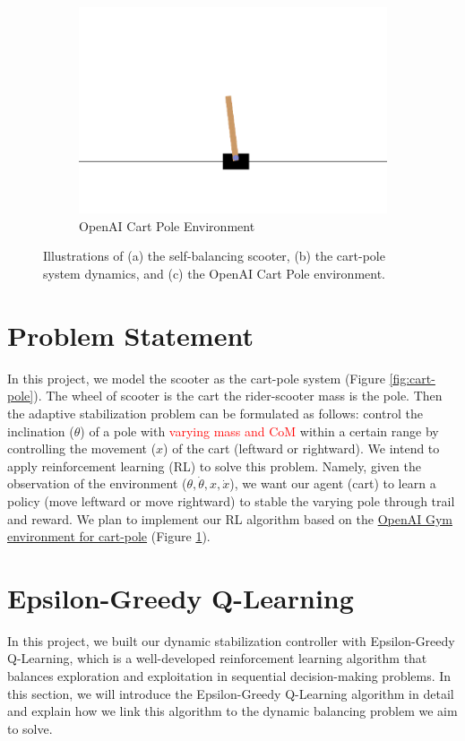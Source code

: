 \documentclass[10pt,a4paper]{article}
\begin{document}
\begin{figure}[H]
\begin{subfigure}[b]{0.3\textwidth}
		\includegraphics[width=\textwidth]{figure/open-ai}
		\caption{OpenAI Cart Pole Environment}
		\label{fig:openai}
	\end{subfigure}
	\caption{Illustrations of (a) the self-balancing scooter, (b) the cart-pole system dynamics, and (c) the OpenAI Cart Pole environment.}
	\label{fig:three graphs}
\end{figure}

\section{Problem Statement}
In this project, we model the scooter as the cart-pole system (Figure \ref{fig:cart-pole}). The wheel of scooter is the cart the rider-scooter mass is the pole. Then the adaptive stabilization problem can be formulated as follows: control the inclination ($\theta$) of a pole with \textcolor{red}{varying mass and CoM} within a certain range by controlling the movement ($x$) of the cart (leftward or rightward).  We intend to apply reinforcement learning (RL) to solve this problem. Namely, given the observation of the environment ($\theta, \dot{\theta}, x, \dot{x}$), we want our agent (cart) to learn a policy (move leftward or move rightward) to stable the varying pole through trail and reward. We plan to implement our RL algorithm based on the \href{https://gymnasium.farama.org/environments/classic_control/cart_pole/}{OpenAI Gym environment for cart-pole} (Figure \ref{fig:openai}). 

\section{Epsilon-Greedy Q-Learning}
In this project, we built our dynamic stabilization controller with Epsilon-Greedy Q-Learning, which is a well-developed reinforcement learning algorithm that balances exploration and exploitation in sequential decision-making problems. In this section, we will introduce the Epsilon-Greedy Q-Learning algorithm in detail and explain how we link this algorithm to the dynamic balancing problem we aim to solve. 
\end{document}
